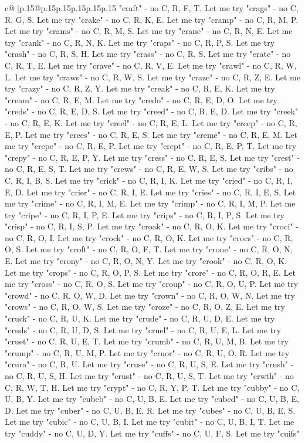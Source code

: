 \documentclass{article}
\begin{document}
{\begin{supertabular}{c@{$\;$}|p{.15\linewidth}@{}p{.15\linewidth}p{.15\linewidth}p{.15\linewidth}p{.15\linewidth}p{.15\linewidth}}
{{{"craft" {-} no C, R, F, T. Let me try "crags" {-} no C, R, G, S. Let me try "crake" {-} no C, R, K, E. Let me try "cramp" {-} no C, R, M, P. Let me try "crams" {-} no C, R, M, S. Let me try "crane" {-} no C, R, N, E. Let me try "crank" {-} no C, R, N, K. Let me try "craps" {-} no C, R, P, S. Let me try "crash" {-} no C, R, S, H. Let me try "crass" {-} no C, R, S. Let me try "crate" {-} no C, R, T, E. Let me try "crave" {-} no C, R, V, E. Let me try "crawl" {-} no C, R, W, L. Let me try "craws" {-} no C, R, W, S. Let me try "craze" {-} no C, R, Z, E. Let me try "crazy" {-} no C, R, Z, Y. Let me try "creak" {-} no C, R, E, K. Let me try "cream" {-} no C, R, E, M. Let me try "credo" {-} no C, R, E, D, O. Let me try "creds" {-} no C, R, E, D, S. Let me try "creed" {-} no C, R, E, D. Let me try "creek" {-} no C, R, E, K. Let me try "creel" {-} no C, R, E, L. Let me try "creep" {-} no C, R, E, P. Let me try "crees" {-} no C, R, E, S. Let me try "creme" {-} no C, R, E, M. Let me try "crepe" {-} no C, R, E, P. Let me try "crept" {-} no C, R, E, P, T. Let me try "crepy" {-} no C, R, E, P, Y. Let me try "cress" {-} no C, R, E, S. Let me try "crest" {-} no C, R, E, S, T. Let me try "crews" {-} no C, R, E, W, S. Let me try "cribs" {-} no C, R, I, B, S. Let me try "crick" {-} no C, R, I, K. Let me try "cried" {-} no C, R, I, E, D. Let me try "crier" {-} no C, R, I, E. Let me try "cries" {-} no C, R, I, E, S. Let me try "crime" {-} no C, R, I, M, E. Let me try "crimp" {-} no C, R, I, M, P. Let me try "cripe" {-} no C, R, I, P, E. Let me try "crips" {-} no C, R, I, P, S. Let me try "crisp" {-} no C, R, I, S, P. Let me try "croak" {-} no C, R, O, K. Let me try "croci" {-} no C, R, O, I. Let me try "crock" {-} no C, R, O, K. Let me try "crocs" {-} no C, R, O, S. Let me try "croft" {-} no C, R, O, F, T. Let me try "crone" {-} no C, R, O, N, E. Let me try "crony" {-} no C, R, O, N, Y. Let me try "crook" {-} no C, R, O, K. Let me try "crops" {-} no C, R, O, P, S. Let me try "crore" {-} no C, R, O, R, E. Let me try "cross" {-} no C, R, O, S. Let me try "croup" {-} no C, R, O, U, P. Let me try "crowd" {-} no C, R, O, W, D. Let me try "crown" {-} no C, R, O, W, N. Let me try "crows" {-} no C, R, O, W, S. Let me try "croze" {-} no C, R, O, Z, E. Let me try "cruck" {-} no C, R, U, K. Let me try "crude" {-} no C, R, U, D, E. Let me try "cruds" {-} no C, R, U, D, S. Let me try "cruel" {-} no C, R, U, E, L. Let me try "cruet" {-} no C, R, U, E, T. Let me try "crumb" {-} no C, R, U, M, B. Let me try "crump" {-} no C, R, U, M, P. Let me try "cruor" {-} no C, R, U, O, R. Let me try "crura" {-} no C, R, U. Let me try "cruse" {-} no C, R, U, S, E. Let me try "crush" {-} no C, R, U, S, H. Let me try "crust" {-} no C, R, U, S, T. Let me try "crwth" {-} no C, R, W, T, H. Let me try "crypt" {-} no C, R, Y, P, T. Let me try "cubby" {-} no C, U, B, Y. Let me try "cubeb" {-} no C, U, B, E. Let me try "cubed" {-} no C, U, B, E, D. Let me try "cuber" {-} no C, U, B, E, R. Let me try "cubes" {-} no C, U, B, E, S. Let me try "cubic" {-} no C, U, B, I. Let me try "cubit" {-} no C, U, B, I, T. Let me try "cuddy" {-} no C, U, D, Y. Let me try "cuffs" {-} no C, U, F, S. Let me try "cuifs" }}}
\end{supertabular}}
\end{document}
